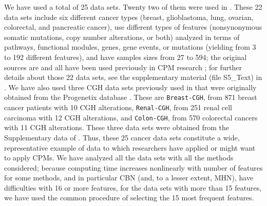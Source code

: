 \documentclass[a4paper,10pt]{article}
\begin{document}
We have used a total of 25 data sets. Twenty two of them were used in
\cite{diaz-uriarte2019a}. These 22 data sets include six different cancer
types (breast, glioblastoma, lung, ovarian, colorectal, and pancreatic
cancer), use different types of features (nonsynonymous somatic mutations,
copy number alterations, or both) analyzed in terms of pathways,
functional modules, genes, gene events, or mutations (yielding from 3 to
192 different features), and have samples sizes from 27 to 594; the
original sources are \cite{bamford2004, TCGA:2008-g, Jones2008,
  parsons2008b, Wood2007, Brennan:2013, ding2008, TCGA2011, Knutsen:2005,
  Piazza:2013, cgan2012} and all have been used previously in CPM research
\cite{Attolini2010a, Gerstung2011, Cheng2012, Misra2014, caprese_2014,
  capri_bioinformatics, capri_pnas, diaz-uriarte2019a}; for further
details about those 22 data sets, see the supplementary material (file
S5\_Text) in \cite{diaz-uriarte2019a}. We have also used
three CGH data sets previously used in \cite{Gerstung2009, schill2020}
that were originally obtained from the Progenetix database
\cite{baudis2001}. These are \texttt{Breast-CGH}, from 871 breast cancer
patients with 10 CGH alterations, \texttt{Renal-CGH}, from 251 renal cell
carcinoma with 12 CGH alterations, and \texttt{Colon-CGH}, from 570
colorectal cancers with 11 CGH alterations. These three data sets were
obtained from the Supplementary data of \cite{schill2020}. Thus, these 25
cancer data sets constitute a wide, representative example of data to
which researchers have applied or might want to apply CPMs. We have
analyzed all the data sets with all the methods considered; because
computing time increases nonlinearly with number of features for some
methods, and in particular CBN (and, to a lesser extent, MHN), have
difficulties with 16 or more features, for the data sets with more than 15
features, we have used the common procedure \cite{Diaz-Uriarte2015} of
selecting the 15 most frequent features.



\end{document}
